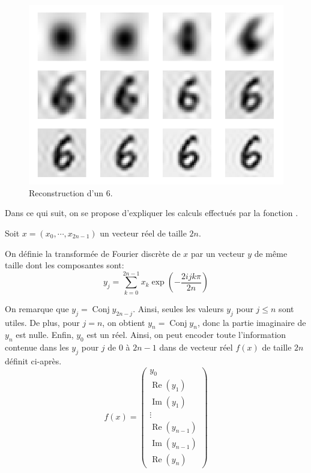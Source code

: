 \begin{figure}[h]
  \centering
  \includegraphics[scale=0.6]{assets/fft-image-num62-reconstruction}
  \caption{Reconstruction d'un $6$.}
  \label{fig:fft-image-reconstruction}
\end{figure}


Dans ce qui suit, on se propose d'expliquer les calculs effectués 
par la fonction .

\renewcommand{\Re}{\operatorname{Re}}
\renewcommand{\Im}{\operatorname{Im}}
\let\conjugatet\overline

Soit $x = (x_0, \cdots, x_{2n-1})$ un vecteur réel de taille $2n$.

On définie la transformée de Fourier discrète de $x$ par un vecteur 
$y$ de même taille dont les composantes sont:
\[
y_j = \sum_{k = 0}^{2n-1} x_k \exp\left(-\frac{2ijk\pi}{2n}\right)
\]

On remarque que $y_j = \operatorname{Conj} y_{2n-j}$. 
Ainsi, seules les valeurs $y_j$ pour $j \leq n$ sont utiles.
De plus, pour $j = n$, on obtient $y_n = \operatorname{Conj} y_{n}$, 
donc la partie imaginaire de $y_n$ est nulle.
Enfin, $y_0$ est un réel.
Ainsi, on peut encoder toute l'information contenue 
dans les $y_j$ pour $j$ de $0$ à $2n-1$ dans de vecteur réel 
$f(x)$ de taille $2n$ définit ci-après.
\[
f(x) = 
\begin{pmatrix}
  y_0 \\
  \Re(y_1) \\
  \Im(y_1) \\
  \vdots \\
  \Re(y_{n-1}) \\
  \Im(y_{n-1}) \\
  \Re(y_n)
\end{pmatrix}
\]

